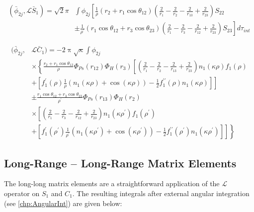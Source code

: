 \documentclass[Dissertation.tex]{subfiles}
\begin{document}
\begin{align}
\label{eq:PWavePhi2SBar}
\nonumber \left(\bar{\phi}_{2j},\mathcal{L} \bar{S}_1\right) = \sqrt{2} \pi & \int \phi_{2j} \left[ \frac{1}{\rho} \left(r_2 + r_1 \cos\theta_{12}\right) \left( \frac{2}{r_1} - \frac{2}{r_2} - \frac{2}{r_{13}} + \frac{2}{r_{23}} \right) S_{22} \right. \\
& \pm \left. \frac{1}{\rho^\prime} \left(r_1 \cos\theta_{12} + r_3 \cos\theta_{23}\right) \left( \frac{2}{r_1} - \frac{2}{r_3} - \frac{2}{r_{12}} + \frac{2}{r_{23}} \right) S_{23} \right]  d\tau_{int}
\end{align}

\begin{align}
\label{eq:PWavePhi2CBar}
\nonumber (\bar{\phi}_{2j},&\mathcal{L} \bar{C}_1) = -2 \uppi \sqrt{\kappa} \int \phi_{2j} \\
&\times \left\{ \frac{r_2 + r_1 \cos\theta_{12}}{\rho} \Phi_{Ps}(r_{12}) \Phi_H(r_3) \left[ \left( \frac{2}{r_1} - \frac{2}{r_2} - \frac{2}{r_{13}} + \frac{2}{r_{23}} \right) n_1(\kappa\rho) f_1(\rho) \right. \right. \\
\nonumber & + \left.\left. \left[f_1^\prime(\rho) \frac{1}{\rho} \left( n_1(\kappa\rho) + \cos(\kappa\rho) \right) - \frac{1}{2} f_1^{\prime\prime}(\rho) n_1(\kappa\rho) \right]\right] \right. \\
\nonumber & \pm \frac{r_1 \cos\theta_{12} + r_3 \cos\theta_{23}}{\rho^\prime}  \Phi_{Ps}(r_{13}) \Phi_H(r_2) \\
& \times \left. \left[ \left( \frac{2}{r_1} - \frac{2}{r_3} - \frac{2}{r_{12}} + \frac{2}{r_{23}} \right) n_1(\kappa\rho^\prime) f_1(\rho^\prime) \right.\right. \\
\nonumber & + \left.\left. \left[f_1^\prime(\rho^\prime) \frac{1}{\rho^\prime} \left( n_1(\kappa\rho^\prime) + \cos(\kappa\rho^\prime) \right) - \frac{1}{2} f_1^{\prime\prime}(\rho^\prime) n_1(\kappa\rho^\prime) \right]\right]\right\}
\end{align}


\subsection{Long-Range -- Long-Range Matrix Elements}
\label{sec:PWaveLongLong}

The long-long matrix elements are a straightforward application of the
$\mathcal{L}$ operator on $S_1$ and $C_1$. The resulting integrals after
external angular integration (see \cref{chp:AngularInt}) are given below: 
\end{document}
